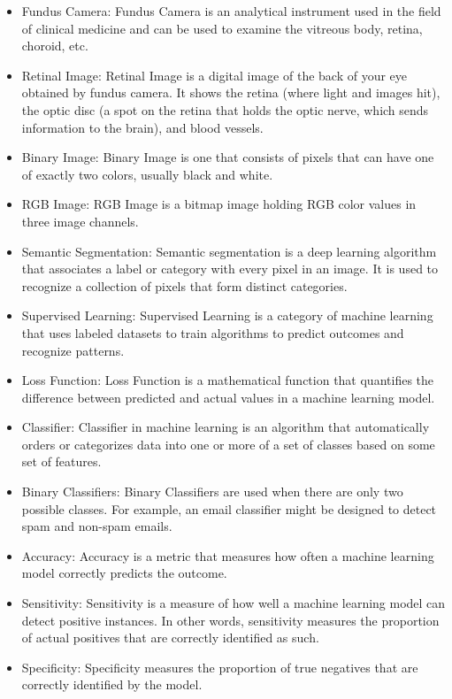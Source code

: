 \documentclass[12pt]{article}
\begin{document}
\begin{itemize}

\item Fundus Camera: Fundus Camera is an analytical instrument used in the field of clinical medicine and can be used to examine the vitreous body, retina, choroid, etc.
\item Retinal Image: Retinal Image is a digital image of the back of your eye obtained by fundus camera. It shows the retina (where light and images hit), the optic disc (a spot on the retina that holds the optic nerve, which sends information to the brain), and blood vessels.
\item Binary Image: Binary Image is one that consists of pixels that can have one of exactly two colors, usually black and white. 
\item RGB Image: RGB Image is a bitmap image holding RGB color values in three image channels.
\item Semantic Segmentation: Semantic segmentation is a deep learning algorithm that associates a label or category with every pixel in an image. It is used to recognize a collection of pixels that form distinct categories.
\item Supervised Learning: Supervised Learning is a category of machine learning that uses labeled datasets to train algorithms to predict outcomes and recognize patterns.
\item Loss Function: Loss Function is a mathematical function that quantifies the difference between predicted and actual values in a machine learning model.
\item Classifier: Classifier in machine learning is an algorithm that automatically orders or categorizes data into one or more of a set of classes based on some set of features.
\item Binary Classifiers: Binary Classifiers are used when there are only two possible classes. For example, an email classifier might be designed to detect spam and non-spam emails.
\item Accuracy: Accuracy is a metric that measures how often a machine learning model correctly predicts the outcome. 
\item Sensitivity: Sensitivity is a measure of how well a machine learning model can detect positive instances. In other words, sensitivity measures the proportion of actual positives that are correctly identified as such.
\item Specificity: Specificity measures the proportion of true negatives that are correctly identified by the model.
\end{itemize}
\end{document}

